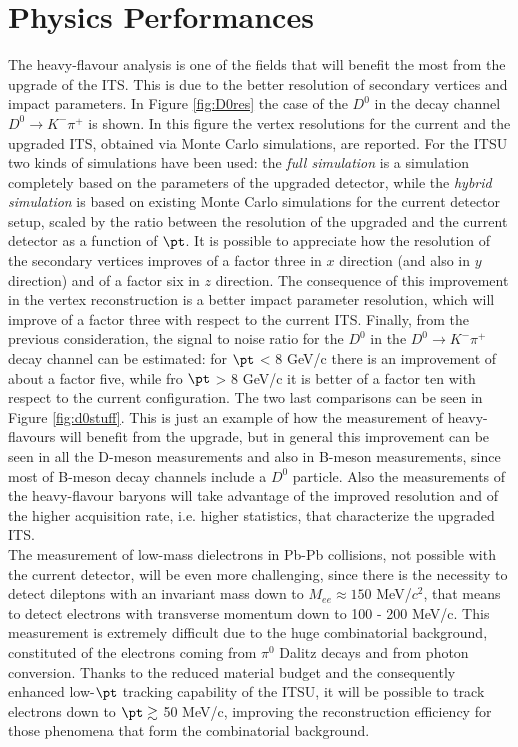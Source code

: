 \section{Physics Performances}
The heavy-flavour analysis is one of the fields that will benefit the most from the upgrade of the ITS. This is due to the better resolution of secondary vertices and impact parameters. In Figure \ref{fig:D0res} the case of the $D^0$ in the decay channel $D^0 \rightarrow K^-\pi^+$ is shown. In this figure the vertex resolutions for the current and the upgraded ITS, obtained via Monte Carlo simulations,  are reported. For the ITSU two kinds of simulations have been used: the \textit{full simulation} is a simulation completely based on the parameters of the upgraded detector, while the \textit{hybrid simulation} is based on existing Monte Carlo simulations for the current detector setup, scaled by the ratio between the resolution of the upgraded and the current detector as a function of $\pt$. It is possible to appreciate how the resolution of the secondary vertices improves of a factor three in $x$ direction (and also in $y$ direction) and of a factor six in $z$ direction. The consequence of this improvement in the vertex reconstruction is a better impact parameter resolution, which will improve of a factor three with respect to the current ITS. Finally, from the previous consideration, the signal to noise ratio for the $D^0$ in the $D^0 \rightarrow K^-\pi^+$ decay channel can be estimated: for $\pt$ < 8 GeV/c there is an improvement of about a factor five, while fro $\pt$ > 8 GeV/c it is better of a factor ten with respect to the current configuration. The two last comparisons can be seen in Figure \ref{fig:d0stuff}. This is just an example of how the measurement of heavy-flavours will benefit from the upgrade, but in general this improvement can be seen in all the D-meson measurements and also in B-meson measurements, since most of B-meson decay channels include a $D^0$ particle. Also the measurements of the heavy-flavour baryons will take advantage of the improved resolution and of the higher acquisition rate, i.e. higher statistics, that characterize the upgraded ITS.\\
The measurement of low-mass dielectrons in Pb-Pb collisions, not possible with the current detector, will be even more challenging, since there is the necessity to detect dileptons with an invariant mass down to $M_{ee} \approx 150$ MeV/$c^2$, that means to detect electrons with transverse momentum down to 100 - 200 MeV/c. This measurement is extremely difficult due to the huge combinatorial background, constituted of the electrons coming from $\pi^0$ Dalitz decays and from photon conversion. Thanks to the reduced material budget and the consequently enhanced low-$\pt$ tracking capability of the ITSU, it will be possible to track electrons down to $\pt \gtrsim $ 50 MeV/c, improving the reconstruction efficiency for those phenomena that form the combinatorial background.
